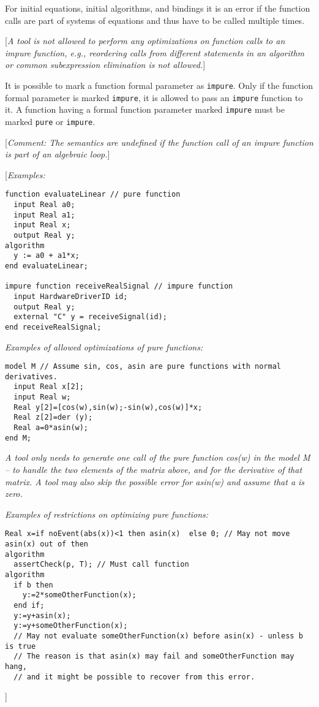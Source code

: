 For initial equations, initial algorithms, and bindings it is an error
if the function calls are part of systems of equations and thus have to
be called multiple times.

{[}\emph{A tool is not allowed to perform any optimizations on function
calls to an impure function, e.g., reordering calls from different
statements in an algorithm or common subexpression elimination is not
allowed.}{]}

It is possible to mark a function formal parameter as \lstinline!impure!. Only if
the function formal parameter is marked \lstinline!impure!, it is allowed to pass an
\lstinline!impure! function to it. A function having a formal function parameter
marked \lstinline!impure! must be marked \lstinline!pure! or \lstinline!impure!.

{[}\emph{Comment: The semantics are undefined if the function call of an
impure function is part of an algebraic loop.}{]}

{[}\emph{Examples:}

\begin{lstlisting}[language=modelica]
function evaluateLinear // pure function
  input Real a0;
  input Real a1;
  input Real x;
  output Real y;
algorithm
  y := a0 + a1*x;
end evaluateLinear;

impure function receiveRealSignal // impure function
  input HardwareDriverID id;
  output Real y;
  external "C" y = receiveSignal(id);
end receiveRealSignal;
\end{lstlisting}
\emph{Examples of allowed optimizations of pure functions:}

\begin{lstlisting}[language=modelica]
model M // Assume sin, cos, asin are pure functions with normal derivatives.
  input Real x[2];
  input Real w;
  Real y[2]=[cos(w),sin(w);-sin(w),cos(w)]*x;
  Real z[2]=der (y);
  Real a=0*asin(w);
end M;
\end{lstlisting}
\emph{A tool only needs to generate one call of the pure function cos(w)
in the model M -- to handle the two elements of the matrix above, and
for the derivative of that matrix. A tool may also skip the possible
error for asin(w) and assume that a is zero.}

\emph{Examples of restrictions on optimizing pure functions:}

\begin{lstlisting}[language=modelica]
  Real x=if noEvent(abs(x))<1 then asin(x)  else 0; // May not move asin(x) out of then
algorithm
  assertCheck(p, T); // Must call function
algorithm
  if b then
    y:=2*someOtherFunction(x);
  end if;
  y:=y+asin(x);
  y:=y+someOtherFunction(x);
  // May not evaluate someOtherFunction(x) before asin(x) - unless b is true
  // The reason is that asin(x) may fail and someOtherFunction may hang,
  // and it might be possible to recover from this error.
\end{lstlisting}
{]}

